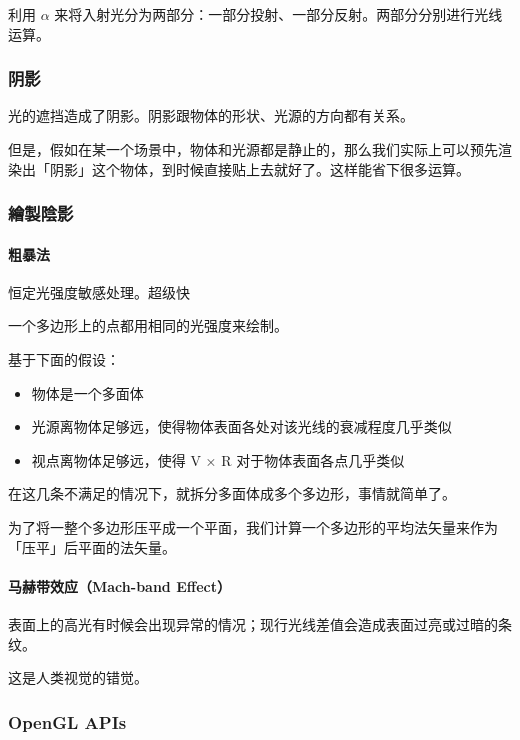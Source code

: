 \documentclass[
]{article}
\begin{document}
利用 \(\alpha\)
来将入射光分为两部分：一部分投射、一部分反射。两部分分别进行光线运算。

\hypertarget{header-n38}{%
\subsubsection{阴影}\label{header-n38}}

光的遮挡造成了阴影。阴影跟物体的形状、光源的方向都有关系。

但是，假如在某一个场景中，物体和光源都是静止的，那么我们实际上可以预先渲染出「阴影」这个物体，到时候直接贴上去就好了。这样能省下很多运算。

\hypertarget{header-n41}{%
\subsubsection{繪製陰影}\label{header-n41}}

\hypertarget{header-n42}{%
\paragraph{粗暴法}\label{header-n42}}

恒定光强度敏感处理。超级快

一个多边形上的点都用相同的光强度来绘制。

基于下面的假设：

\begin{itemize}
\item
  物体是一个多面体
\item
  光源离物体足够远，使得物体表面各处对该光线的衰减程度几乎类似
\item
  视点离物体足够远，使得 V × R 对于物体表面各点几乎类似
\end{itemize}

在这几条不满足的情况下，就拆分多面体成多个多边形，事情就简单了。

为了将一整个多边形压平成一个平面，我们计算一个多边形的平均法矢量来作为「压平」后平面的法矢量。

\hypertarget{header-n55}{%
\paragraph{马赫带效应（Mach-band Effect）}\label{header-n55}}

表面上的高光有时候会出现异常的情况；现行光线差值会造成表面过亮或过暗的条纹。

这是人类视觉的错觉。

\hypertarget{header-n58}{%
\subsubsection{OpenGL APIs}\label{header-n58}}
\end{document}
